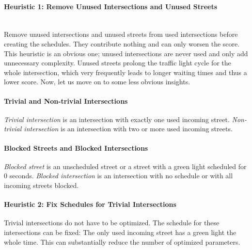 \paragraph{Heuristic 1: Remove Unused Intersections and Unused Streets} \mbox{} \\
Remove unused intersections and unused streets from used intersections before creating the schedules. They contribute nothing and can only worsen the score. \\

This heuristic is an obvious one; unused intersections are never used and only add unnecessary complexity. Unused streets prolong the traffic light cycle for the whole intersection, which very frequently leads to longer waiting times and thus a lower score. Now, let us move on to some less obvious insights.

\paragraph{Trivial and Non-trivial Intersections} \textit{Trivial intersection} is an intersection with exactly one used incoming street. \textit{Non-trivial intersection} is an intersection with two or more used incoming streets.

\paragraph{Blocked Streets and Blocked Intersections} \textit{Blocked street} is an unscheduled street or a street with a green light scheduled for 0 seconds. \textit{Blocked intersection} is an intersection with no schedule or with all incoming streets blocked.

\paragraph{Heuristic 2: Fix Schedules for Trivial Intersections} Trivial intersections do not have to be optimized. The schedule for these intersections can be fixed: The only used incoming street has a green light the whole time. This can substantially reduce the number of optimized parameters. \\

